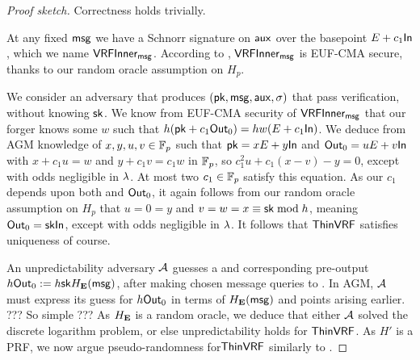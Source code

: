 \begin{proof}[Proof sketch]
Correctness holds trivially.

At any fixed $\mathsf{msg}$ we have a Schnorr signature on $\mathsf{aux}$
 over the basepoint $E + c_1 {\mathsf{In}}$, which we name ${\mathsf{VRFInner}}_{\mathsf{msg}}$.
According to \cite[\S5]{cryptoeprint:2020:823},
 ${\mathsf{VRFInner}}_{\mathsf{msg}}$ is EUF-CMA secure,
 thanks to our random oracle assumption on $H_p$.

We consider an adversary that produces $(\mathsf{pk},\mathsf{msg},\mathsf{aux},\sigma)$
 that pass verification, without knowing $\mathsf{sk}$.  
We know from EUF-CMA security of ${\mathsf{VRFInner}}_{\mathsf{msg}}$ that
our forger knows some $w$ such that
 $h (\mathsf{pk} + c_1 {\mathsf{Out}}_0) = h w (E + c_1 {\mathsf{In}})$.
We deduce from AGM knowledge of $x,y,u,v \in \mathbb{F}_p$ such that
 $\mathsf{pk} = x E + y {\mathsf{In}}$ and ${\mathsf{Out}}_0 = u E + v {\mathsf{In}}$
 with $x + c_1 u = w$ and $y + c_1 v = c_1 w$ in $\mathbb{F}_p$,
 so $c_1^2 u + c_1 (x-v) - y = 0$, except with odds negligible in $\lambda$.
At most two $c_1 \in \mathbb{F}_p$ satisfy this equation.
As our $c_1$ depends upon both \pk and ${\mathsf{Out}}_0$, 
it again follows from our random oracle assumption on $H_p$ that
 $u=0=y$ and $v = w = x \equiv \mathsf{sk} \bmod h$, meaning ${\mathsf{Out}}_0 = \mathsf{sk} {\mathsf{In}}$,
 except with odds negligible in $\lambda$.
It follows that ${\mathsf{ThinVRF}}$ satisfies uniqueness of course. 

An unpredictability adversary $\mathcal{A}$ guesses
 a \msg and corresponding pre-output $h {\mathsf{Out}}_0 := h \mathsf{sk} H_{\mathbf{E}}(\mathsf{msg})$,
after making chosen message queries to \Sign.
In AGM, $\mathcal{A}$ must express its guess for $h {\mathsf{Out}}_0$
 in terms of $H_{\mathbf{E}}(\mathsf{msg})$ and points arising earlier.
???  So simple ???
As $H_{\mathbf{E}}$ is a random oracle, we deduce that either
 $\mathcal{A}$ solved the discrete logarithm problem, or else
 unpredictability holds for ${\mathsf{ThinVRF}}$.
As $H'$ is a PRF, we now argue pseudo-randomness for${\mathsf{ThinVRF}}$ similarly
 to \cite[Proposition 1]{vrf_micali}.
\end{proof}

